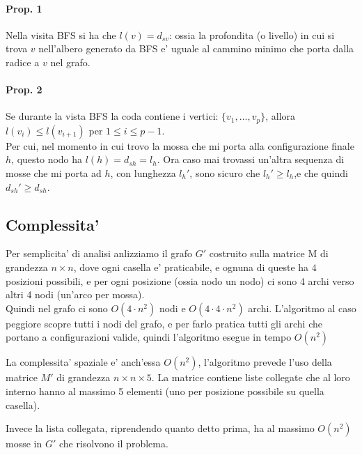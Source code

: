 \paragraph{Prop. 1}
Nella visita BFS si ha che $l(v) = d_{sv}$: ossia la profondita (o livello) in cui si trova $v$ 
nell'albero generato da BFS e' uguale al cammino minimo che porta dalla radice a $v$ nel grafo. \\

\paragraph{Prop. 2}
Se durante la vista BFS la coda contiene i vertici: $\{v_1, \dots, v_p\}$, allora $l(v_i) \leq l(v_{i+1})$
per $1 \leq i \leq p-1$. \\

Per cui, nel momento in cui trovo la mossa che mi porta alla configurazione finale $h$, questo nodo ha $l(h) = d_{sh} = l_h$.
Ora caso mai trovassi un'altra sequenza di mosse che mi porta ad $h$, con lunghezza $l_h'$, sono sicuro che $l_h' \geq l_h$,e 
che quindi $d_{sh}' \geq d_{sh}$.

\subsection{Complessita'}
Per semplicita' di analisi anlizziamo il grafo $G'$ costruito sulla matrice M di grandezza $n \times n$, dove ogni casella e' praticabile, e ognuna di queste 
ha $4$ posizioni possibili, e per ogni posizione (ossia nodo un nodo) ci sono 4 archi verso altri 4 nodi (un'arco per 
mossa). \\

Quindi nel grafo ci sono $O(4 \cdot n^2)$ nodi e $O(4 \cdot 4 \cdot n^2)$ archi. L'algoritmo al caso peggiore
scopre tutti i nodi del grafo, e per farlo pratica tutti gli archi che portano a configurazioni valide, quindi
l'algoritmo esegue in tempo $O(n^2)$

La complessita' spaziale e' anch'essa $O(n^2)$, l'algoritmo prevede l'uso della matrice $M'$ di grandezza $n \times n \times 5$.
La matrice contiene liste collegate che al loro interno hanno al massimo 5 elementi (uno per posizione possibile su quella casella).

Invece la lista collegata, riprendendo quanto detto prima, ha al massimo $O(n^2)$ mosse in $G'$ che risolvono il problema. 


\newpage
\begin{tcolorbox}[
    colback=white,           %
    colframe=black,          %
    coltitle=black,          %
    colbacktitle=gray!50,    %
    boxrule=1pt,             %
    title=\textbf{Commenti Esercizio}
    ]
    
\vspace{45\baselineskip}

\end{tcolorbox}
\newpage
